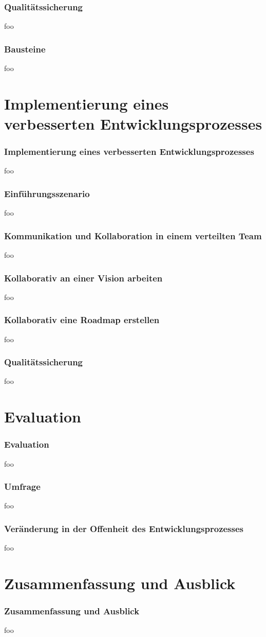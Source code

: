 \documentclass{beamer}
\begin{document}
\begin{frame}
\frametitle{Qualit\"atssicherung}
foo
\end{frame}

\begin{frame}
\frametitle{Bausteine}
foo
\end{frame}

\section{Implementierung eines verbesserten Entwicklungsprozesses}

\begin{frame}
\frametitle{Implementierung eines verbesserten Entwicklungsprozesses}
foo
\end{frame}

\begin{frame}
\frametitle{Einf\"uhrungsszenario}
foo
\end{frame}

\begin{frame}
\frametitle{Kommunikation und Kollaboration in einem verteilten Team}
foo
\end{frame}

\begin{frame}
\frametitle{Kollaborativ an einer Vision arbeiten}
foo
\end{frame}

\begin{frame}
\frametitle{Kollaborativ eine Roadmap erstellen}
foo
\end{frame}

\begin{frame}
\frametitle{Qualit\"atssicherung}
foo
\end{frame}

\section{Evaluation}

\begin{frame}
\frametitle{Evaluation}
foo
\end{frame}

\begin{frame}
\frametitle{Umfrage}
foo
\end{frame}

\begin{frame}
\frametitle{Ver\"anderung in der Offenheit des Entwicklungsprozesses}
foo
\end{frame}

\section{Zusammenfassung und Ausblick}

\begin{frame}
\frametitle{Zusammenfassung und Ausblick}
foo
\end{frame}
\end{document}
